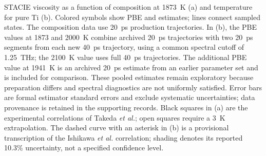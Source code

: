 \caption{STACIE viscosity as a function of composition at 1873~K (a) and temperature for pure Ti (b). Colored symbols show PBE and \rscan{} estimates; lines connect sampled states. The composition data use 20~ps production trajectories. In (b), the PBE values at 1873 and 2000~K combine archived 20~ps trajectories with two 20~ps segments from each new 40~ps trajectory, using a common spectral cutoff of 1.25~THz; the 2100~K value uses full 40~ps trajectories. The additional PBE value at 1941~K is an archived 20~ps estimate from an earlier parameter set and is included for comparison. These pooled estimates remain exploratory because preparation differs and spectral diagnostics are not uniformly satisfied. Error bars are formal estimator standard errors and exclude systematic uncertainties; data provenance is retained in the supporting records. Black squares in (a) are the experimental correlations of Takeda \textit{et al.}\cite{Takeda2025}; open squares require a 3~K extrapolation. The dashed curve with an asterisk in (b) is a provisional transcription of the Ishikawa \textit{et al.}\cite{Ishikawa2012} correlation; shading denotes its reported 10.3\% uncertainty, not a specified confidence level.}
